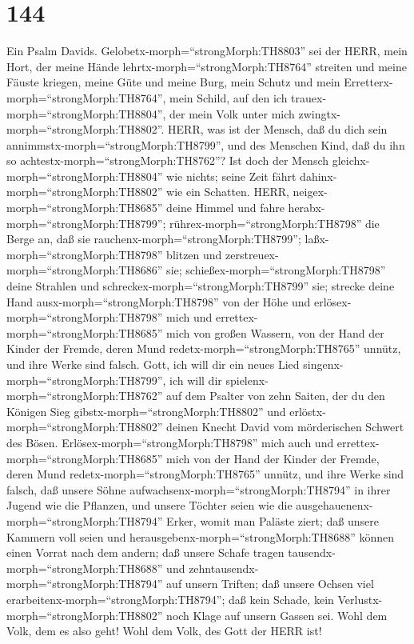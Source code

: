 \hypertarget{section-143}{%
\section{144}\label{section-143}}

 Ein Psalm Davids. Gelobetx-morph=``strongMorph:TH8803'' sei
der HERR, mein Hort, der meine Hände lehrtx-morph=``strongMorph:TH8764''
streiten und meine Fäuste kriegen,  meine Güte und meine
Burg, mein Schutz und mein Erretterx-morph=``strongMorph:TH8764'', mein
Schild, auf den ich trauex-morph=``strongMorph:TH8804'', der mein Volk
unter mich zwingtx-morph=``strongMorph:TH8802''.  HERR, was
ist der Mensch, daß du dich sein annimmstx-morph=``strongMorph:TH8799'',
und des Menschen Kind, daß du ihn so
achtestx-morph=``strongMorph:TH8762''?  Ist doch der Mensch
gleichx-morph=``strongMorph:TH8804'' wie nichts; seine Zeit fährt
dahinx-morph=``strongMorph:TH8802'' wie ein Schatten.  HERR,
neigex-morph=``strongMorph:TH8685'' deine Himmel und fahre
herabx-morph=``strongMorph:TH8799''; rührex-morph=``strongMorph:TH8798''
die Berge an, daß sie rauchenx-morph=``strongMorph:TH8799'';
 laßx-morph=``strongMorph:TH8798'' blitzen und
zerstreuex-morph=``strongMorph:TH8686'' sie;
schießex-morph=``strongMorph:TH8798'' deine Strahlen und
schreckex-morph=``strongMorph:TH8799'' sie;  strecke deine
Hand ausx-morph=``strongMorph:TH8798'' von der Höhe und
erlösex-morph=``strongMorph:TH8798'' mich und
errettex-morph=``strongMorph:TH8685'' mich von großen Wassern, von der
Hand der Kinder der Fremde,  deren Mund
redetx-morph=``strongMorph:TH8765'' unnütz, und ihre Werke sind falsch.
 Gott, ich will dir ein neues Lied
singenx-morph=``strongMorph:TH8799'', ich will dir
spielenx-morph=``strongMorph:TH8762'' auf dem Psalter von zehn Saiten,
 der du den Königen Sieg
gibstx-morph=``strongMorph:TH8802'' und
erlöstx-morph=``strongMorph:TH8802'' deinen Knecht David vom
mörderischen Schwert des Bösen. 
Erlösex-morph=``strongMorph:TH8798'' mich auch und
errettex-morph=``strongMorph:TH8685'' mich von der Hand der Kinder der
Fremde, deren Mund redetx-morph=``strongMorph:TH8765'' unnütz, und ihre
Werke sind falsch,  daß unsere Söhne
aufwachsenx-morph=``strongMorph:TH8794'' in ihrer Jugend wie die
Pflanzen, und unsere Töchter seien wie die
ausgehauenenx-morph=``strongMorph:TH8794'' Erker, womit man Paläste
ziert;  daß unsere Kammern voll seien und
herausgebenx-morph=``strongMorph:TH8688'' können einen Vorrat nach dem
andern; daß unsere Schafe tragen tausendx-morph=``strongMorph:TH8688''
und zehntausendx-morph=``strongMorph:TH8794'' auf unsern Triften;
 daß unsere Ochsen viel
erarbeitenx-morph=``strongMorph:TH8794''; daß kein Schade, kein
Verlustx-morph=``strongMorph:TH8802'' noch Klage auf unsern Gassen sei.
 Wohl dem Volk, dem es also geht! Wohl dem Volk, des Gott
der HERR ist!

